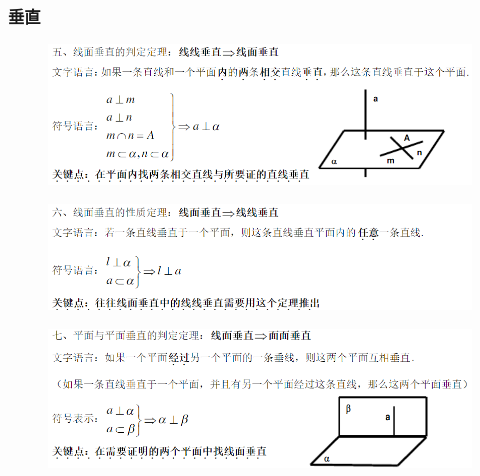 \documentclass[hyperref, UTF8,11pt,a4paper]{ctexart} %
\begin{document}
	\subsubsection{垂直}
	\begin{figure}[!h] %
		\centering
		\includegraphics[width=450pt]  {pic/litijihe/xmczpd.png} \\

	\end{figure}
	\begin{figure}[!h] %
		\centering
		\includegraphics[width=450pt]  {pic/litijihe/xmczxz.png} \\

	\end{figure}
	\begin{figure}[!h] %
		\centering
		\includegraphics[width=450pt]  {pic/litijihe/mmczpd.png} \\

	\end{figure}
\end{document}
